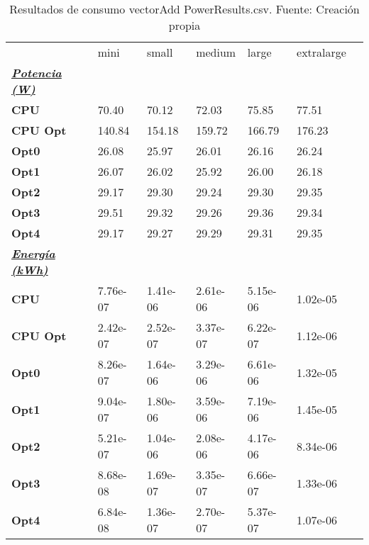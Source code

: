 \begin{table}[H]
    \centering
    \begin{tabular}{lllllll}
    \rowcolor[HTML]{DAE8FC} \ & mini & small & medium & 	large & 	extralarge \\
    \cellcolor[HTML]{DAE8FC} \textbf{\textbf{{\emph{{\underline{{Potencia (W)}}}}}}} &  &  &  & 	 & 	 \\
    \rowcolor[HTML]{EFEFEF} \cellcolor[HTML]{DAE8FC} \textbf{CPU} & 70.40 & 70.12 & 72.03 & 	75.85 & 	77.51 \\
    \cellcolor[HTML]{DAE8FC} \textbf{CPU Opt} & 140.84 & 154.18 & 159.72 & 	166.79 & 	176.23 \\
    \rowcolor[HTML]{EFEFEF} \cellcolor[HTML]{DAE8FC} \textbf{Opt0} & 26.08 & 25.97 & 26.01 & 	26.16 & 	26.24 \\
    \cellcolor[HTML]{DAE8FC} \textbf{Opt1} & 26.07 & 26.02 & 25.92 & 	26.00 & 	26.18 \\
    \rowcolor[HTML]{EFEFEF} \cellcolor[HTML]{DAE8FC} \textbf{Opt2} & 29.17 & 29.30 & 29.24 & 	29.30 & 	29.35 \\
    \cellcolor[HTML]{DAE8FC} \textbf{Opt3} & 29.51 & 29.32 & 29.26 & 	29.36 & 	29.34 \\
    \rowcolor[HTML]{EFEFEF} \cellcolor[HTML]{DAE8FC} \textbf{Opt4} & 29.17 & 29.27 & 29.29 & 	29.31 & 	29.35 \\
    \cellcolor[HTML]{DAE8FC} \textbf{\textbf{{\emph{{\underline{{Energía (kWh)}}}}}}} &  &  &  & 	 & 	 \\
    \rowcolor[HTML]{EFEFEF} \cellcolor[HTML]{DAE8FC} \textbf{CPU} & 7.76e-07 & 1.41e-06 & 2.61e-06 & 	5.15e-06 & 	1.02e-05 \\
    \cellcolor[HTML]{DAE8FC} \textbf{CPU Opt} & 2.42e-07 & 2.52e-07 & 3.37e-07 & 	6.22e-07 & 	1.12e-06 \\
    \rowcolor[HTML]{EFEFEF} \cellcolor[HTML]{DAE8FC} \textbf{Opt0} & 8.26e-07 & 1.64e-06 & 3.29e-06 & 	6.61e-06 & 	1.32e-05 \\
    \cellcolor[HTML]{DAE8FC} \textbf{Opt1} & 9.04e-07 & 1.80e-06 & 3.59e-06 & 	7.19e-06 & 	1.45e-05 \\
    \rowcolor[HTML]{EFEFEF} \cellcolor[HTML]{DAE8FC} \textbf{Opt2} & 5.21e-07 & 1.04e-06 & 2.08e-06 & 	4.17e-06 & 	8.34e-06 \\
    \cellcolor[HTML]{DAE8FC} \textbf{Opt3} & 8.68e-08 & 1.69e-07 & 3.35e-07 & 	6.66e-07 & 	1.33e-06 \\
    \rowcolor[HTML]{EFEFEF} \cellcolor[HTML]{DAE8FC} \textbf{Opt4} & 6.84e-08 & 1.36e-07 & 2.70e-07 & 	5.37e-07 & 	1.07e-06 \\
    \end{tabular}
    \caption[Resultados de consumo vectorAdd PowerResults.csv]{{Resultados de consumo vectorAdd PowerResults.csv. Fuente: Creación propia}}
    \label{table_global_vectorAdd_PowerResults_data}
\end{table}